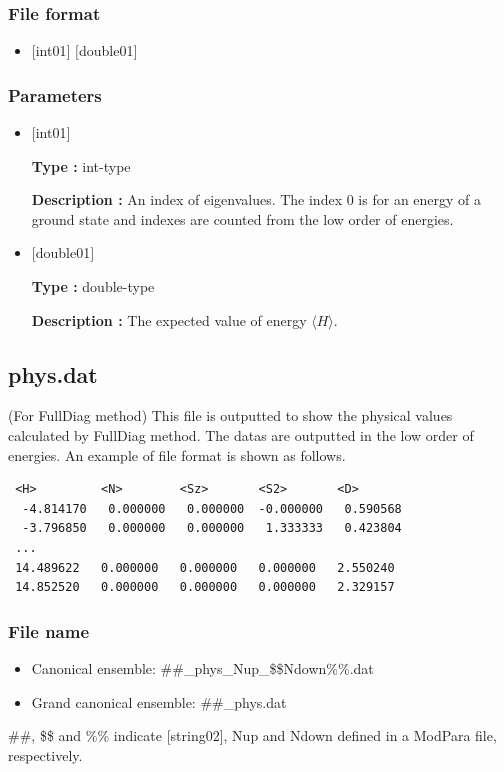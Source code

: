 \subsubsection{File format}
 \begin{itemize}
   \item $[$int01$]$ $[$double01$]$ 
  \end{itemize}
\subsubsection{Parameters}
 \begin{itemize}

  \item  $[$int01$]$
  
 {\bf Type :} int-type

{\bf Description :} An index of eigenvalues. The index 0 is for an energy of a ground state and indexes are counted from the low order of energies.

  \item  $[$double01$]$
  
 {\bf Type :} double-type

{\bf Description :} The expected value of energy $\langle H \rangle$.
 
 \end{itemize}



\newpage
\subsection{phys.dat}
\label{Subsec:phys}
(For FullDiag method)  This file is outputted to show the physical values calculated by FullDiag method.  The datas are outputted in the low order of energies. An example of file format is shown as follows.\\
\begin{minipage}{12.5cm}
\begin{screen}
\begin{verbatim}
 <H>         <N>        <Sz>       <S2>       <D> 
  -4.814170   0.000000   0.000000  -0.000000   0.590568
  -3.796850   0.000000   0.000000   1.333333   0.423804
 ...
 14.489622   0.000000   0.000000   0.000000   2.550240
 14.852520   0.000000   0.000000   0.000000   2.329157
\end{verbatim}
\end{screen}
\end{minipage}

\subsubsection{File name}
\begin{itemize}
   \item {Canonical ensemble:} \#\#\_phys\_Nup\_\$\$Ndown\%\%.dat
   \item {Grand canonical ensemble:} \#\#\_phys.dat
 \end{itemize}
  \#\#, \$\$ and \%\% indicate [string02], Nup and Ndown defined in a ModPara file, respectively.

